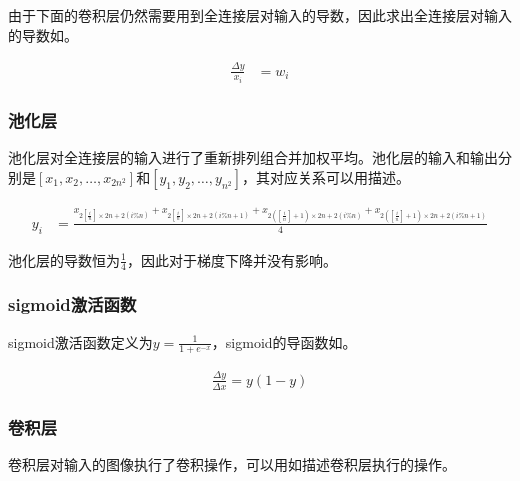 由于下面的卷积层仍然需要用到全连接层对输入的导数，因此求出全连接层对输入的导数如。

\begin{equation}\label{eq:affine-x-bp}
\begin{aligned}
\frac{\Delta y}{x_i} &= w_i
\end{aligned}
\end{equation}

\subsubsection{池化层}

池化层对全连接层的输入进行了重新排列组合并加权平均。池化层的输入和输出分别是$[x_1, x_2, \dots, x_{2n^2}]$和$[y_1, y_2, \dots , y_{n^2}]$，其对应关系可以用描述。

\begin{equation}\label{eq:pooling-bp}
\begin{aligned}
y_i &= \frac{ x_{2 [\frac{i}{n}] \times 2n + 2(i \% n)} + x_{2 [\frac{i}{n}] \times 2n + 2(i \% n + 1)} + x_{2 ([\frac{i}{n}] + 1) \times 2n + 2(i \% n)} + x_{2 ([\frac{i}{n}] + 1) \times 2n + 2(i \% n + 1)} }{4}
\end{aligned}
\end{equation}

池化层的导数恒为$\frac{1}{4}$，因此对于梯度下降并没有影响。

\subsubsection{sigmoid激活函数}

sigmoid激活函数定义为$y=\frac{1}{1+e^{-x}}$，sigmoid的导函数如。

\begin{equation}\label{eq:sigmoid-bp}
\begin{aligned}
\frac{\Delta y}{\Delta x} = y(1-y)
\end{aligned}
\end{equation}

\subsubsection{卷积层}

卷积层对输入的图像执行了卷积操作，可以用如描述卷积层执行的操作。

